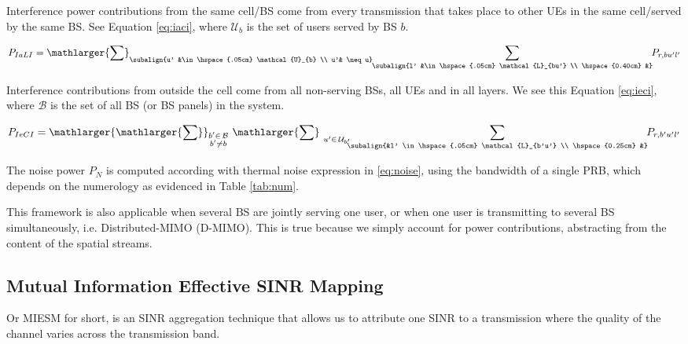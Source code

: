 Interference power contributions from the same cell/BS come from every transmission that takes place to other UEs in the same cell/served by the same BS. See Equation \eqref{eq:iaci}, where $\mathcal{U}_{b}$ is the set of users served by BS $b$.

\begin{equation} \label{eq:iaci}
    P_{IaLI} = \mathlarger{\sum}_{\subalign{u' &\in \hspace{.05cm} \mathcal{U}_{b} \\ u'& \neq u}} \hspace{-0.1cm} \sum_{\subalign{l' &\in \hspace{.05cm} \mathcal{L}_{bu'} \\ \hspace{0.40cm} &}} \hspace{-0.1cm} P_{r, bu'l'} 
\end{equation}

Interference contributions from outside the cell come from all non-serving BSs, all UEs and in all layers. We see this Equation \eqref{eq:ieci}, where $\mathcal{B}$ is the set of all BS (or BS panels) in the system.

\begin{equation} \label{eq:ieci}
    P_{IeCI} = \mathlarger{\mathlarger{\sum}}_{\substack{b' \in \hspace{.05cm} \mathcal{B} \\ b' \neq b}} \ \mathlarger{\sum}_{\ u' \in \hspace{.05cm} \mathcal{U}_{b'}} \hspace{-0.2cm} \sum_{\subalign{&l' \in \hspace{.05cm} \mathcal{L}_{b'u'} \\ \hspace{0.25cm} &}} \hspace{-0.1cm} P_{r, b'u'l'} 
\end{equation}

The noise power $P_N$ is computed according with thermal noise expression in \ref{eq:noise}, using the bandwidth of a single PRB, which depends on the numerology as evidenced in Table \ref{tab:num}.

This framework is also applicable when several BS are jointly serving one user, or when one user is transmitting to several BS simultaneously, i.e. Distributed-MIMO (D-MIMO). This is true because we simply account for power contributions, abstracting from the content of the spatial streams.


\subsection{Mutual Information Effective SINR Mapping }
Or MIESM for short, is an SINR aggregation technique that allows us to attribute one SINR to a transmission where the quality of the channel varies across the transmission band.

